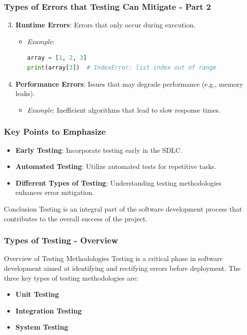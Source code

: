 \documentclass{beamer}
\begin{document}
\begin{frame}
    \frametitle{Types of Errors that Testing Can Mitigate - Part 2}
    \begin{enumerate}
        \setcounter{enumi}{2} %
        \item \textbf{Runtime Errors}: Errors that only occur during execution.
        \begin{itemize}
            \item \textit{Example}:
            \begin{lstlisting}[language=Python]
array = [1, 2, 3]
print(array[3])  # IndexError: list index out of range
            \end{lstlisting}
        \end{itemize}

        \item \textbf{Performance Errors}: Issues that may degrade performance (e.g., memory leaks).
        \begin{itemize}
            \item \textit{Example}: Inefficient algorithms that lead to slow response times.
        \end{itemize}
    \end{enumerate}
\end{frame}

\begin{frame}
    \frametitle{Key Points to Emphasize}
    \begin{itemize}
        \item \textbf{Early Testing}: Incorporate testing early in the SDLC.
        \item \textbf{Automated Testing}: Utilize automated tests for repetitive tasks.
        \item \textbf{Different Types of Testing}: Understanding testing methodologies enhances error mitigation.
    \end{itemize}
    \begin{block}{Conclusion}
        Testing is an integral part of the software development process that contributes to the overall success of the project.
    \end{block}
\end{frame}

\begin{frame}[fragile]
    \frametitle{Types of Testing - Overview}
    \begin{block}{Overview of Testing Methodologies}
        Testing is a critical phase in software development aimed at identifying and rectifying errors before deployment. The three key types of testing methodologies are:
        \begin{itemize}
            \item \textbf{Unit Testing}
            \item \textbf{Integration Testing}
            \item \textbf{System Testing}
        \end{itemize}
    \end{block}
\end{frame}
\end{document}
